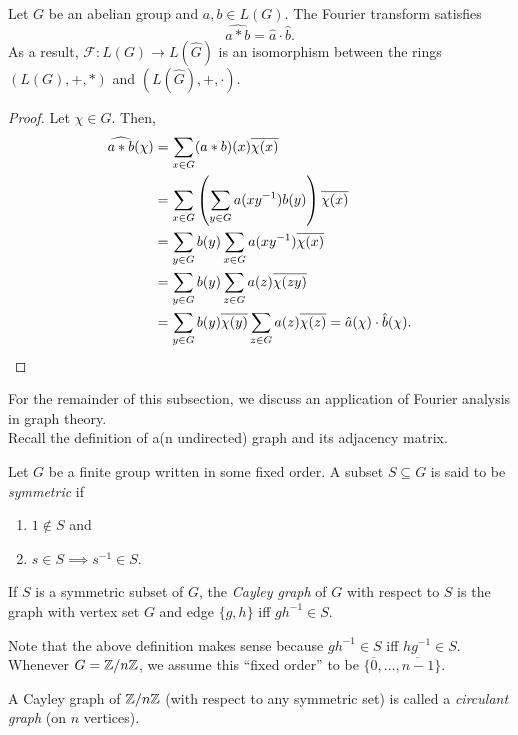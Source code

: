 		\begin{ftheo}
			\label{theo: fourier isomorphism of rings abelian}
			Let $G$ be an abelian group and $a,b \in L(G)$. The Fourier transform satisfies 
			\[ \widehat{a * b} = \hat{a} \cdot \hat{b}. \]
			As a result, $\mathcal{F} : L(G) \to L(\hat{G})$ is an isomorphism between the rings $(L(G),+,*)$ and $(L(\hat{G}),+,\cdot)$.
		\end{ftheo}
		\begin{proof}
			Let $\chi \in \hat{G}$. Then,
			\begin{align*}
				\widehat{a * b}(\chi) &= \sum_{x \in G} (a * b)(x) \overline{\chi(x)} \\
					&= \sum_{x \in G} \left(\sum_{y \in G} a(xy^{-1}) b(y)\right) \overline{\chi(x)} \\
					&= \sum_{y \in G} b(y) \sum_{x \in G} a(xy^{-1}) \overline{\chi(x)} \\
					&= \sum_{y \in G} b(y) \sum_{z \in G} a(z) \overline{\chi(zy)} \\
					&= \sum_{y \in G} b(y) \overline{\chi(y)} \sum_{z \in G} a(z) \overline{\chi(z)} = \hat{a}(\chi) \cdot \hat{b}(\chi). \qedhere
			\end{align*}
		\end{proof}

		For the remainder of this subsection, we discuss an application of Fourier analysis in graph theory.\\
		Recall the definition of a(n undirected) graph and its adjacency matrix.

		\begin{fdef}
			Let $G$ be a finite group written in some fixed order. A subset $S \subseteq G$ is said to be \emph{symmetric} if
			\begin{enumerate}
				\item $1\not\in S$ and
				\item $s \in S \implies s^{-1} \in S$.
			\end{enumerate}
			If $S$ is a symmetric subset of $G$, the \emph{Cayley graph} of $G$ with respect to $S$ is the graph with vertex set $G$ and edge $\{g,h\}$ iff $gh^{-1} \in S$.
		\end{fdef}

		Note that the above definition makes sense because $gh^{-1} \in S$ iff $hg^{-1} \in S$.\\
		Whenever $G = \mathbb{Z}/n\mathbb{Z}$, we assume this ``fixed order'' to be $\{\overline{0},\ldots,\overline{n-1}\}$.

		\begin{definition}
			A Cayley graph of $\mathbb{Z}/n\mathbb{Z}$ (with respect to any symmetric set) is called a \emph{circulant graph} (on $n$ vertices).
		\end{definition}

